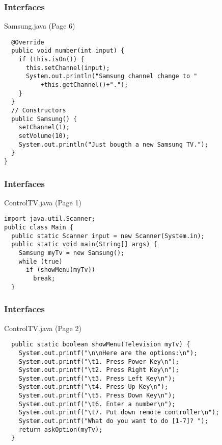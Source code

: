 \documentclass[10pt, compress]{beamer}
\begin{document}
\begin{frame}[fragile]
  \frametitle{Interfaces}
  \begin{block}{Samsung.java (Page 6)}
    \begin{verbatim}
  @Override
  public void number(int input) {
    if (this.isOn()) {
      this.setChannel(input);
      System.out.println("Samsung channel change to "
          +this.getChannel()+".");
    }
  }
  // Constructors
  public Samsung() {
    setChannel(1);
    setVolume(10);
    System.out.println("Just bougth a new Samsung TV.");
  }
}
    \end{verbatim}
  \end{block}
\end{frame}

\begin{frame}[fragile]
  \frametitle{Interfaces}
  \begin{block}{ControlTV.java (Page 1)}
    \begin{verbatim}
import java.util.Scanner;
public class Main {
  public static Scanner input = new Scanner(System.in);
  public static void main(String[] args) {
    Samsung myTv = new Samsung();
    while (true)
      if (showMenu(myTv))
        break;
  }
    \end{verbatim}
  \end{block}
\end{frame}

\begin{frame}[fragile]
  \frametitle{Interfaces}
  \begin{block}{ControlTV.java (Page 2)}
    \begin{verbatim}
  public static boolean showMenu(Television myTv) {
    System.out.printf("\n\nHere are the options:\n");
    System.out.printf("\t1. Press Power Key\n");
    System.out.printf("\t2. Press Right Key\n");
    System.out.printf("\t3. Press Left Key\n");
    System.out.printf("\t4. Press Up Key\n");
    System.out.printf("\t5. Press Down Key\n");
    System.out.printf("\t6. Enter a number\n");
    System.out.printf("\t7. Put down remote controller\n");
    System.out.printf("What do you want to do [1-7]? ");
    return askOption(myTv);
  }
    \end{verbatim}
  \end{block}
\end{frame}
\end{document}
